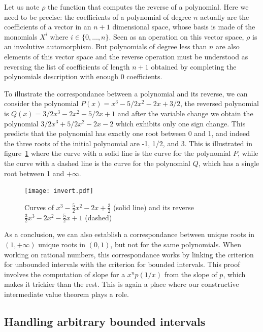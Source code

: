 \documentclass{mscs}
\begin{document}
Let us note \(\rho\) the function that computes the reverse of a
polynomial.  Here we need to be precise: the coefficients of a
polynomial of degree \(n\) actually are the coefficients of a vector
in an \(n+1\) dimensional space, whose basis is made of the monomials
\(X^i\) where \(i\in\{0,\dots, n\}\).  Seen as an operation on this vector
space, \(\rho\) is an involutive automorphism.  But
polynomials of degree less than \(n\) are also elements of this vector
space and the reverse operation must be understood as reversing the
list of coefficients of length \(n+1\) obtained by completing the
polynomials description with enough 0 coefficients.


To illustrate the correspondance between a polynomial and its reverse,
we can consider the polynomial \(P(x) = x^3 - 5/2 x^2 - 2 x + 3/2\),
the reversed polynomial is \(Q(x) = 3/2 x^3 - 2 x^2 - 5/2 x + 1\) and after
the variable change we obtain the polynomial \(3/2 x^3 + 5/2 x^2 - 2 x - 2\)
which exhibits only one sign change.  This predicts that the polynomial has
exactly one root between 0 and 1, and indeed the three roots of the initial
polynomial are -1, 1/2, and 3.  This is illustrated in
figure~\ref{invert} where the curve with a solid line is the curve for the
polynomial \(P\), while the curve with a dashed line is the curve for
the polynomial \(Q\), which has a single root between 1 and \(+\infty\).
\begin{figure}\label{invert}
\begin{center}
\texttt{[image: invert.pdf]}
\end{center}
\caption{Curves of \(x^3 -\frac{5}{2} x^2 - 2 x +
  \frac{3}{2}\) (solid line)
and its reverse \(\frac{3}{2}x^3 -2 x^2 - \frac{5}{2} x + 1\) (dashed)}
\end{figure}

As a conclusion, we can also establish a correspondance between unique
roots in \((1,+\infty)\) unique roots in \((0,1)\), but not for the
same polynomials.  When working on rational numbers, this
correspondance works by linking the criterion for unbounded intervals
with the criterion for bounded intervals.  This proof involves the
computation of slope for a \(x^np(1/x)\) from the slope of \(p\),
which makes it trickier than the rest.  This is again a place where
our constructive intermediate value theorem plays a role.

\subsection{Handling arbitrary bounded intervals}
\end{document}
